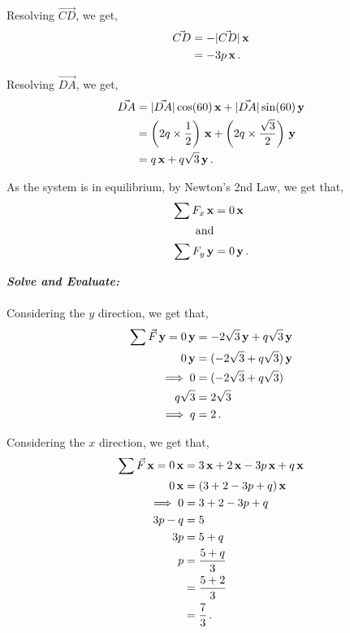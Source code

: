 \begin{subquestions}
Resolving $\vec{CD}$, we get,
\begin{align}
	\vec{CD} & = -|\vec{CD}|\,\mathbf{x} \nonumber \\
			 & = -3p\,\mathbf{x} \,.
\end{align}

Resolving $\vec{DA}$, we get,
\begin{align}
	\vec{DA} & = |\vec{DA}|\cos(60)\,\mathbf{x} + |\vec{DA}|\sin(60)\,\mathbf{y} \nonumber \\
	         & = \left(2q\times \frac{1}{2}\right)\,\mathbf{x} + \left(2q\times\frac{\sqrt{3}}{2}\right)\,\mathbf{y} \nonumber \\
	         & = q\,\mathbf{x} + q\sqrt{3}\,\mathbf{y} \,.
\end{align}

As the system is in equilibrium, by Newton's 2nd Law, we get that,
\begin{align}
	\sum F_x\,\mathbf{x} & = 0\,\mathbf{x} \nonumber \\
	\text{and} \nonumber \\
	\sum F_y\,\mathbf{y} & = 0\,\mathbf{y} \,.
\end{align}




\textbf{\textit{Solve and Evaluate:}} \\ \\
Considering the $y$ direction, we get that,
\begin{align}
	\sum\vec{F}\,\mathbf{y} = 0\,\mathbf{y} & = -2\sqrt{3}\,\mathbf{y} + q\sqrt{3}\,\mathbf{y} \nonumber \\
	                   0\,\mathbf{y} & = (-2\sqrt{3} +q\sqrt{3})\,\mathbf{y} \nonumber \\
	        \implies   0 & =  (-2\sqrt{3} +q\sqrt{3}) \nonumber \\
					q\sqrt{3} & = 2\sqrt{3} \nonumber \\
				   \implies q & = 2 \,.
\end{align}

Considering the $x$ direction, we get that,
\begin{align}
	\sum\vec{F}\,\mathbf{x} = 0\,\mathbf{x} & = 3\,\mathbf{x} + 2\,\mathbf{x} -3p\,\mathbf{x} +q\,\mathbf{x} \nonumber \\
	                   0\,\mathbf{x} & = (3+2-3p+q)\,\mathbf{x} \nonumber \\
	\implies 0 & = 3+2-3p+q \nonumber \\
			 3p-q & = 5 \nonumber \\
	           3p & = 5+q \nonumber \\
	            p & = \frac{5+q}{3} \nonumber \\
	              & = \frac{5+2}{3} \nonumber \\
	              & = \frac{7}{3} \,.
\end{align}


\end{subquestions}